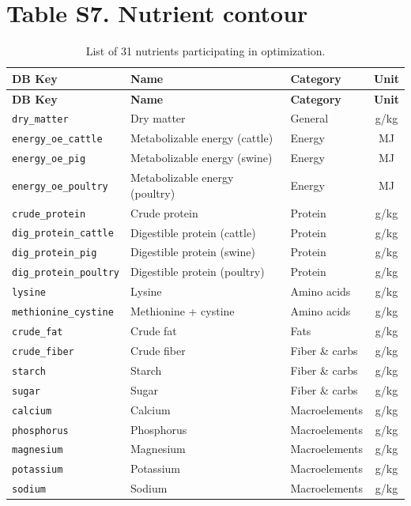 \documentclass[11pt]{article}
\begin{document}
\section*{Table S7. Nutrient contour}
\begin{longtable}{lllc}
\caption{List of 31 nutrients participating in optimization.}\label{tab:s7_nutrients} \\
\toprule
\textbf{DB Key} & \textbf{Name} & \textbf{Category} & \textbf{Unit} \\
\midrule
\endfirsthead
\toprule
\textbf{DB Key} & \textbf{Name} & \textbf{Category} & \textbf{Unit} \\
\midrule
\endhead
\bottomrule
\endfoot
\bottomrule
\endlastfoot
\texttt{dry\_matter} & Dry matter & General & g/kg \\
\texttt{energy\_oe\_cattle} & Metabolizable energy (cattle) & Energy & MJ \\
\texttt{energy\_oe\_pig} & Metabolizable energy (swine) & Energy & MJ \\
\texttt{energy\_oe\_poultry} & Metabolizable energy (poultry) & Energy & MJ \\
\texttt{crude\_protein} & Crude protein & Protein & g/kg \\
\texttt{dig\_protein\_cattle} & Digestible protein (cattle) & Protein & g/kg \\
\texttt{dig\_protein\_pig} & Digestible protein (swine) & Protein & g/kg \\
\texttt{dig\_protein\_poultry} & Digestible protein (poultry) & Protein & g/kg \\
\texttt{lysine} & Lysine & Amino acids & g/kg \\
\texttt{methionine\_cystine} & Methionine + cystine & Amino acids & g/kg \\
\texttt{crude\_fat} & Crude fat & Fats & g/kg \\
\texttt{crude\_fiber} & Crude fiber & Fiber \& carbs & g/kg \\
\texttt{starch} & Starch & Fiber \& carbs & g/kg \\
\texttt{sugar} & Sugar & Fiber \& carbs & g/kg \\
\texttt{calcium} & Calcium & Macroelements & g/kg \\
\texttt{phosphorus} & Phosphorus & Macroelements & g/kg \\
\texttt{magnesium} & Magnesium & Macroelements & g/kg \\
\texttt{potassium} & Potassium & Macroelements & g/kg \\
\texttt{sodium} & Sodium & Macroelements & g/kg \\

\end{longtable}
\end{document}
